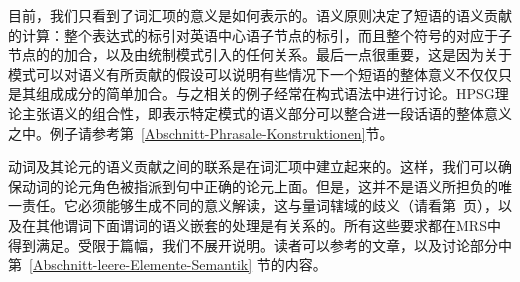 目前，我们只看到了词汇项的意义是如何表示的。语义原则决定了短语的语义贡献的计算：整个表达式的标引对英语中心语子节点的标引，而且整个符号的\relsv 对应于子节点的\relsvs 的加合，以及由统制模式引入的任何关系。最后一点很重要，这是因为关于模式可以对语义有所贡献的假设可以说明有些情况下一个短语的整体意义不仅仅只是其组成成分的简单加合。与之相关的例子经常在构式语法中进行讨论\indexcxg 。HPSG理论主张语义的组合性，即表示特定模式的语义部分可以整合进一段话语的整体意义之中。例子请参考第~\ref{Abschnitt-Phrasale-Konstruktionen}节。

动词及其论元的语义贡献之间的联系是在词汇项中建立起来的。这样，我们可以确保动词的论元角色被指派到句中正确的论元上面。但是，这并不是语义所担负的唯一责任。它必须能够生成不同的意义解读，这与量词辖域的歧义（请看第~\pageref{Beispiel-Every-man-loves-a-woman}页），以及在其他谓词下面谓词的语义嵌套的处理是有关系的。所有这些要求都在MRS中得到满足。受限于篇幅，我们不展开说明。读者可以参考\citet*{CFPS2005a}的文章，以及讨论部分中第~\ref{Abschnitt-leere-Elemente-Semantik} 节的内容。


